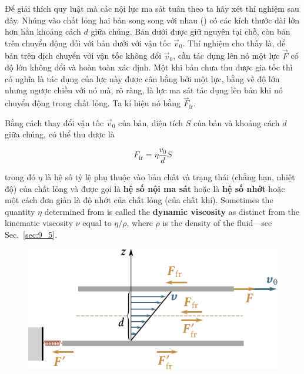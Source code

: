 Để giải thích quy luật mà các nội lực ma sát tuân theo ta hãy xét thí nghiệm sau đây. Nhúng vào chất lỏng hai bản song song với nhau () có các kích thước dài lớn hơn hẳn khoảng cách $d$ giữa chúng. Bản dưới được giữ nguyên tại chỗ, còn bản trên chuyển động đối với bản dưới với vận tốc $\vec{v}_0$. Thí nghiệm cho thấy là, để bản trên dịch chuyển với vận tốc không đổi $\vec{v}_0$, cần tác dụng lên nó một lực $\vec{F}$ có độ lớn không đổi và hoàn toàn xác định. Một khi bản chưa thu được gia tốc thì có nghĩa là tác dụng của lực này được cân bằng bởi một lực, bằng về độ lớn nhưng ngược chiều với nó mà, rõ ràng, là lực ma sát tác dụng lên bản khi nó chuyển động trong chất lỏng. Ta kí hiệu nó bằng $\vec{F}_{\text{fr}}$.


Bằng cách thay đổi vận tốc $\vec{v}_0$ của bản, diện tích $S$ của bản và khoảng cách $d$ giữa chúng, có thể thu được là

\begin{equation}\label{eq:9_9}
	F_{\text{fr}} = \eta\frac{v_0}{d}S
\end{equation}
\noindent


trong đó $\eta$ là hệ số tỷ lệ phụ thuộc vào bản chất và trạng thái (chẳng hạn, nhiệt độ) của chất lỏng và được gọi là \textbf{hệ số nội ma sát} hoặc là \textbf{hệ số nhớt} hoặc một cách đơn giản là độ nhớt của chất lỏng (của chất khí). Sometimes the quantity $\eta$ determined from  is called the \textbf{dynamic viscosity} as distinct from the kinematic viscosity $\nu$ equal to $\eta/\rho$, where $\rho$ is the density of the fluid---see Sec.~\ref{sec:9_5}.

\begin{figure}[!htb]
	\begin{center}
		\includegraphics[scale=1.0]{figures/ch_09/fig_9_9.pdf}
		\caption[]{}
		\label{fig:9_9}
	\end{center}
	\vspace{-0.8cm}
\end{figure}

